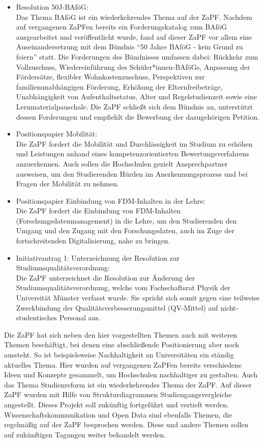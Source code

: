\documentclass[a4paper, 11pt]{scrartcl}
\begin{document}
\begin{itemize}
		\item Resolution 50J-BAföG:\\
Das Thema BAföG ist ein wiederkehrendes Thema auf der ZaPF. Nachdem auf vergangenen ZaPFen bereits ein Forderungskatalog zum BAföG ausgearbeitet und veröffentlicht wurde, fand auf dieser ZaPF vor allem eine Auseinandersetzung mit dem Bündnis “50 Jahre BAföG - kein Grund zu feiern” statt. Die Forderungen des Bündnisses umfassen dabei: Rückkehr zum Vollzuschuss, Wiedereinführung des Schüler*innen-BAföGs, Anpassung der Fördersätze, flexibler Wohnkostenzuschuss, Perspektiven zur familienunabhängigen Förderung, Erhöhung der Elternfreibeträge, Unabhängigkeit von Aufenthaltsstatus, Alter und Regelstudienzeit sowie eine Lernmaterialpauschale. Die ZaPF schließt sich dem Bündnis an, unterstützt dessen Forderungen und empfiehlt die Bewerbung der dazugehörigen Petition.

		\item Positionspapier Mobilität:\\
Die ZaPF fordert die Mobilität und Durchlässigkeit im Studium zu erhöhen und Leistungen anhand eines kompetenzorientierten Bewertungsverfahrens anzuerkennen. Auch sollen die Hochschulen gezielt Ansprechpartner ausweisen, um den Studierenden Hürden im Anerkennungsprozess und bei Fragen der Mobilität zu nehmen.

		\item Positionspapier Einbindung von FDM-Inhalten in der Lehre:\\
Die ZaPF fordert die Einbindung von FDM-Inhalten (Forschungsdatenmanagement) in die Lehre, um den Studierenden den Umgang und den Zugang mit den Forschungsdaten, auch im Zuge der fortschreitenden Digitalisierung, nahe zu bringen.

		\item Initiativantrag 1: Unterzeichnung der Resolution zur Studiumsqualitätsverordnung:\\
Die ZaPF unterzeichnet die Resolution zur Änderung der Studiumsqualitätsverordnung, welche vom Fachschaftsrat Physik der Universität Münster verfasst wurde. Sie spricht sich somit gegen eine teilweise Zweckbindung der Qualitätsverbesserungsmittel (QV-Mittel) auf nicht-studentisches Personal aus.

	\end{itemize}

Die ZaPF hat sich neben den hier vorgestellten Themen auch mit weiteren Themen beschäftigt, bei denen eine abschließende Positionierung aber noch aussteht. So ist beispielsweise Nachhaltigkeit an Universitäten ein ständig aktuelles Thema. Hier wurden auf vergangenen ZaPFen bereits verschiedene Ideen und Konzepte gesammelt, um Hochschulen nachhaltiger zu gestalten. Auch das Thema Studienreform ist ein wiederkehrendes Thema der ZaPF. Auf dieser ZaPF wurden mit Hilfe von Strukturdiagrammen Studiengangsvergleiche angestellt. Dieses Projekt soll zukünftig fortgeführt und vertieft werden. Wissenschaftskommunikation und Open Data sind ebenfalls Themen, die regelmäßig auf der ZaPF besprochen werden. Diese und andere Themen sollen auf zukünftigen Tagungen weiter behandelt werden.
\end{document}
